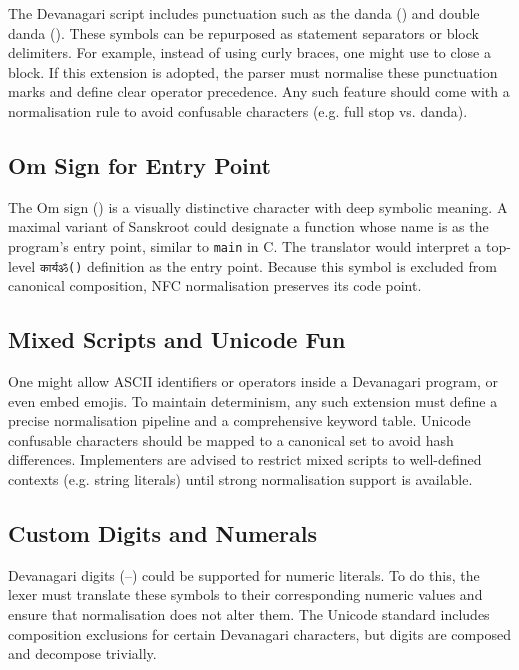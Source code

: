 \documentclass[12pt]{article}
\begin{document}
The Devanagari script includes punctuation such as the danda ()
and double danda ().  These symbols can be repurposed as
statement separators or block delimiters.  For example, instead of using
curly braces, one might use  to close a block.  If this
extension is adopted, the parser must normalise these punctuation marks and
define clear operator precedence.  Any such feature should come with a
normalisation rule to avoid confusable characters (e.g. full stop vs. danda).

\subsection{Om Sign for Entry Point}

The Om sign () is a visually distinctive character with deep
symbolic meaning.  A maximal variant of Sanskroot could designate a
function whose name is  as the program’s entry point, similar
to \texttt{main} in C.  The translator would interpret a top-level
\texttt{कार्यॐ()} definition as the entry point.  Because this symbol is
excluded from canonical composition, NFC normalisation preserves its code
point.

\subsection{Mixed Scripts and Unicode Fun}

One might allow ASCII identifiers or operators inside a Devanagari program,
or even embed emojis.  To maintain determinism, any such extension must
define a precise normalisation pipeline and a comprehensive keyword table.
Unicode confusable characters should be mapped to a canonical set to avoid
hash differences.  Implementers are advised to restrict mixed scripts to
well-defined contexts (e.g. string literals) until strong normalisation
support is available.

\subsection{Custom Digits and Numerals}

Devanagari digits (–) could be supported for
numeric literals.  To do this, the lexer must translate these symbols to
their corresponding numeric values and ensure that normalisation does not
alter them.  The Unicode standard includes composition exclusions for
certain Devanagari characters, but digits are
composed and decompose trivially.
\end{document}
